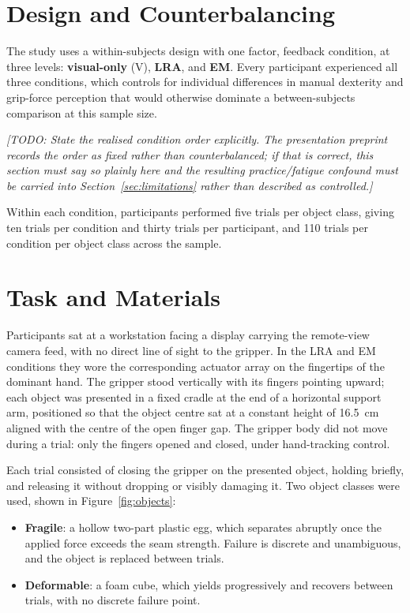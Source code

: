 \documentclass[12pt, a4paper, twoside, openright]{report}
\newcommand{\todo}[1]{\textit{[TODO: #1]}}
\begin{document}
\section{Design and Counterbalancing}
\label{sec:design}

The study uses a within-subjects design with one factor, feedback condition, at
three levels: \textbf{visual-only} (V), \textbf{LRA}, and \textbf{EM}. Every
participant experienced all three conditions, which controls for individual
differences in manual dexterity and grip-force perception that would otherwise
dominate a between-subjects comparison at this sample size.

\todo{State the realised condition order explicitly. The presentation preprint
    records the order as fixed rather than counterbalanced; if that is correct, this
    section must say so plainly here and the resulting practice/fatigue confound
    must be carried into Section~\ref{sec:limitations} rather than described as
    controlled.}

Within each condition, participants performed five trials per object class,
giving ten trials per condition and thirty trials per participant, and 110
trials per condition per object class across the sample.

\section{Task and Materials}
\label{sec:task}

Participants sat at a workstation facing a display carrying the remote-view
camera feed, with no direct line of sight to the gripper. In the LRA and EM
conditions they wore the corresponding actuator array on the fingertips of the
dominant hand. The gripper stood vertically with its fingers pointing upward;
each object was presented in a fixed cradle at the end of a horizontal support
arm, positioned so that the object centre sat at a constant height of
\SI{16.5}{\centi\metre} aligned with the centre of the open finger gap. The
gripper body did not move during a trial: only the fingers opened and closed,
under hand-tracking control.

Each trial consisted of closing the gripper on the presented object, holding
briefly, and releasing it without dropping or visibly damaging it. Two object
classes were used, shown in Figure~\ref{fig:objects}:

\begin{itemize}
    \item \textbf{Fragile}: a hollow two-part plastic egg, which separates
          abruptly once the applied force exceeds the seam strength. Failure is
          discrete and unambiguous, and the object is replaced between trials.
    \item \textbf{Deformable}: a foam cube, which yields progressively and
          recovers between trials, with no discrete failure point.
\end{itemize}
\end{document}
